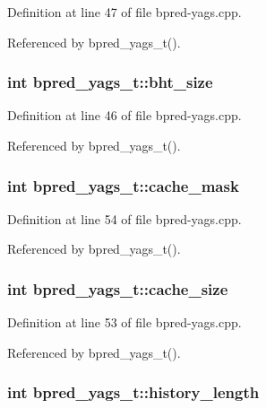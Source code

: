 Definition at line 47 of file bpred-yags.cpp.

Referenced by bpred\_\-yags\_\-t().
\subsubsection[{bht\_\-size}]{\setlength{\rightskip}{0pt plus 5cm}int {\bf bpred\_\-yags\_\-t::bht\_\-size}\hspace{0.3cm}{\tt  [protected]}}\label{classbpred__yags__t_845ed4068d81ea7e3a96878b65ee4acb}




Definition at line 46 of file bpred-yags.cpp.

Referenced by bpred\_\-yags\_\-t().
\subsubsection[{cache\_\-mask}]{\setlength{\rightskip}{0pt plus 5cm}int {\bf bpred\_\-yags\_\-t::cache\_\-mask}\hspace{0.3cm}{\tt  [protected]}}\label{classbpred__yags__t_420610261a8496b9a3c31594b752a482}




Definition at line 54 of file bpred-yags.cpp.

Referenced by bpred\_\-yags\_\-t().
\subsubsection[{cache\_\-size}]{\setlength{\rightskip}{0pt plus 5cm}int {\bf bpred\_\-yags\_\-t::cache\_\-size}\hspace{0.3cm}{\tt  [protected]}}\label{classbpred__yags__t_9d064fd29deb0773fc9a20b4da4319e5}




Definition at line 53 of file bpred-yags.cpp.

Referenced by bpred\_\-yags\_\-t().
\subsubsection[{history\_\-length}]{\setlength{\rightskip}{0pt plus 5cm}int {\bf bpred\_\-yags\_\-t::history\_\-length}\hspace{0.3cm}{\tt  [protected]}}\label{classbpred__yags__t_d916a6911cbe067395cb5cbf83b99fee}




